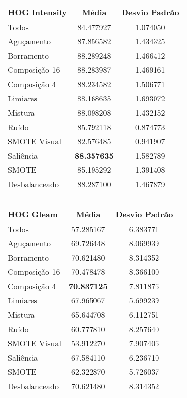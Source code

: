 \begin{table}[!htbp]
\centering
\caption{}
\label{tab:resultados:x:melhor}
\begin{tabular}{|l|c|c|}
\hline
\textbf{HOG Intensity} & \textbf{Média}     & \textbf{Desvio Padrão} \\ \hline
   Todos        & 84.477927  & 1.074050  \\ \hline
  Aguçamento    & 87.856582  & 1.434325  \\ \hline
  Borramento    & 88.289248  & 1.466412  \\ \hline
  Composição 16 & 88.283987  & 1.469161  \\ \hline
  Composição 4  & 88.234582  & 1.506771  \\ \hline
  Limiares      & 88.168635  & 1.693072  \\ \hline
  Mistura       & 88.098208  & 1.432152  \\ \hline
  Ruído         & 85.792118  & 0.874773  \\ \hline
  SMOTE Visual  & 82.576485  & 0.941907  \\ \hline
  Saliência     & \textbf{88.357635}  & 1.582789  \\ \hline
 SMOTE          & 85.195292  & 1.391408  \\ \hline
Desbalanceado   & 88.287100  & 1.467879  \\ \hline
\end{tabular}
\end{table}


\begin{table}[!htbp]
\centering
\caption{}
\label{tab:resultados:x:melhor}
\begin{tabular}{|l|c|c|}
\hline
\textbf{HOG Gleam} & \textbf{Média}     & \textbf{Desvio Padrão} \\ \hline
   Todos        &  57.285167 &  6.383771  \\ \hline
  Aguçamento    &  69.726448 &  8.069939  \\ \hline
  Borramento    &  70.621480 &  8.314352  \\ \hline
  Composição 16 &  70.478478 &  8.366100  \\ \hline
  Composição 4  &  \textbf{70.837125} &  7.811876  \\ \hline
  Limiares      &  67.965067 &  5.699239  \\ \hline
  Mistura       &  65.644708 &  6.112751  \\ \hline
  Ruído         &  60.777810 &  8.257640  \\ \hline
  SMOTE Visual  &  53.912270 &  7.907406  \\ \hline
  Saliência     &  67.584110 &  6.236710  \\ \hline
 SMOTE          &  62.322870 &  5.726037  \\ \hline
Desbalanceado   &  70.621480 &  8.314352  \\ \hline
\end{tabular}
\end{table}


